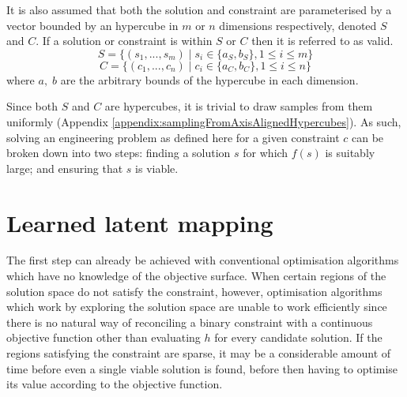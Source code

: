 \documentclass[../../main.tex]{subfiles}
\begin{document}
It is also assumed that both the solution and constraint are parameterised by a vector bounded by an hypercube in $m$ or $n$ dimensions respectively, denoted $S$ and $C$.
If a solution or constraint is within $S$ or $C$ then it is referred to as valid.
\begin{equation}
    S=\{(s_1,...,s_m)\;|\;s_i\in\{a_S,b_S\},1\le i\le m\}
\end{equation}
\begin{equation}
    C=\{(c_1,...,c_n)\;|\;c_i\in\{a_C,b_C\},1\le i\le n\}
\end{equation}
where $a,\;b$ are the arbitrary bounds of the hypercube in each dimension.

Since both $S$ and $C$ are hypercubes, it is trivial to draw samples from them uniformly (Appendix \ref{appendix:samplingFromAxisAlignedHypercubes}).
As such, solving an engineering problem as defined here for a given constraint $c$ can be broken down into two steps: finding a solution $s$ for which $f(s)$ is suitably large; and ensuring that $s$ is viable.

\section{Learned latent mapping} \label{section:learnedLatentMapping}

The first step can already be achieved with conventional optimisation algorithms which have no knowledge of the objective surface.
When certain regions of the solution space do not satisfy the constraint, however, optimisation algorithms which work by exploring the solution space are unable to work efficiently since there is no natural way of reconciling a binary constraint with a continuous objective function other than evaluating $h$ for every candidate solution.
If the regions satisfying the constraint are sparse, it may be a considerable amount of time before even a single viable solution is found, before then having to optimise its value according to the objective function.
\end{document}
